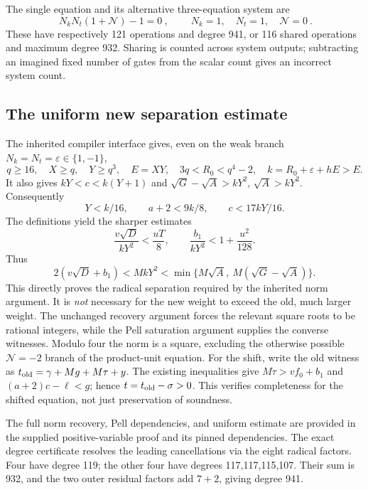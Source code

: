 \documentclass[11pt]{article}
\begin{document}
The single equation and its alternative three-equation system are
\begin{equation}\label{eq:twelve}
 \boxed{\ N_kN_t(1+\mathcal N)-1=0\ },\qquad
 \boxed{\ N_k=1,\quad N_t=1,\quad\mathcal N=0\ }.
\end{equation}
These have respectively 121 operations and degree 941, or 116 shared
operations and maximum degree 932. Sharing is counted across system outputs;
subtracting an imagined fixed number of gates from the scalar count gives an
incorrect system count.

\subsection{The uniform new separation estimate}
The inherited compiler interface gives, even on the weak branch
$N_k=N_t=\varepsilon\in\{1,-1\}$,
\[
 q\ge16,\quad X\ge q,\quad Y\ge q^3,\quad E=XY,\quad
 3q<R_0<q^4-2,\quad k=R_0+\varepsilon+hE>E.
\]
It also gives $kY<c<k(Y+1)$ and
$\sqrt G-\sqrt A>kY^2$, $\sqrt A>kY^2$. Consequently
\[
 Y<k/16,\qquad a+2<9k/8,\qquad c<17kY/16.
\]
The definitions yield the sharper estimates
\[
 \frac{v\sqrt D}{kY^2}<\frac{uT}{8},\qquad
 \frac{b_1}{kY^2}<1+\frac{u^2}{128}.
\]
Thus
\[
 2(v\sqrt D+b_1)<MkY^2
 <\min\{M\sqrt A,\ M(\sqrt G-\sqrt A)\}.
\]
This directly proves the radical separation required by the inherited
norm argument. It is \emph{not} necessary for the new weight to exceed the
old, much larger weight. The unchanged recovery argument forces the relevant
square roots to be rational integers, while the Pell saturation argument
supplies the converse witnesses. Modulo four the norm is a square, excluding
the otherwise possible $\mathcal N=-2$ branch of the product-unit equation.
For the shift, write the old witness as
$t_{\rm old}=\gamma+Mg+M\tau+y$. The existing inequalities give
$M\tau>vf_0+b_1$ and $(a+2)c-\ell<g$; hence
$t=t_{\rm old}-\sigma>0$. This verifies completeness for the shifted equation,
not just preservation of soundness.

The full norm recovery, Pell dependencies, and uniform estimate are provided
in the supplied positive-variable proof and its pinned dependencies.
The exact degree certificate resolves the leading cancellations via the eight
radical factors. Four have degree 119; the other four have degrees
117,117,115,107. Their sum is 932, and the two outer residual factors add
$7+2$, giving degree 941.
\end{document}
